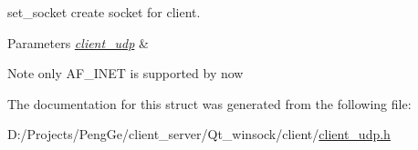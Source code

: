 set\+\_\+socket create socket for client. 


\begin{DoxyParams}{Parameters}
{\em \hyperlink{structclient__udp}{client\+\_\+udp}} & \\
\hline
\end{DoxyParams}
\begin{DoxyNote}{Note}
only A\+F\+\_\+\+I\+N\+E\+T is supported by now 
\end{DoxyNote}


The documentation for this struct was generated from the following file\+:\begin{DoxyCompactItemize}
\item 
D\+:/\+Projects/\+Peng\+Ge/client\+\_\+server/\+Qt\+\_\+winsock/client/\hyperlink{client__udp_8h}{client\+\_\+udp.\+h}\end{DoxyCompactItemize}
